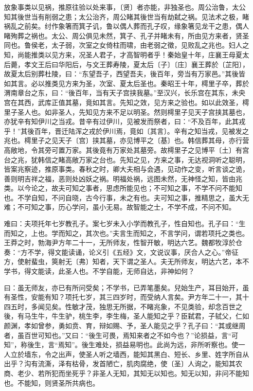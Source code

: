 \documentclass[]{article}
\begin{document}
放象事类以见祸，推原往验以处来事，〔贤〕者亦能，非独圣也。周公治鲁，太公知其後世当有削弱之患；太公治齐，周公睹其後世当有劫弑之祸。见法术之极，睹祸乱之前矣。纣作象箸而箕子讥，鲁以偶人葬而孔子叹，缘象箸见龙干之患，偶人睹殉葬之祸也。太公、周公俱见未然，箕子、孔子并睹未有，所由见方来者，贤圣同也。鲁侯老，太子弱，次室之女倚柱而啸，由老弱之徵，见败乱之兆也。妇人之知，尚能推类以见方来，况圣人君子，才高智明者乎！秦始皇十年，庄襄王母夏太后薨，孝文王后曰华阳后，与文王葬寿陵，夏太后〔子〕〔庄〕襄王葬於〔芷阳〕，故夏太后别葬杜陵，曰：``东望吾子，西望吾夫，後百年，旁当有万家邑。''其後皆如其言。必以推类见方来为圣，次室、夏太后圣也。秦昭王十年，樗里子卒，葬於渭南章台之东，曰：``後百年，当有天子宫挟我墓。''至汉兴，长乐宫在其东，未央宫在其西，武库正值其墓，竟如其言。先知之效，见方来之验也。如以此效圣，樗里子圣人也。如非圣人，先知见方来不足以明圣。然则樗里子见天子宫挟其墓也，亦犹辛有知伊川之当戎。昔辛有过伊川，见被发而祭者，曰：``不及百年，此其戎乎！''其後百年，晋迁陆浑之戎於伊川焉，竟如〔其言〕。辛有之知当戎，见被发之兆也。樗里子之见天子〔宫〕挟其墓，亦见博平之〔基〕也。韩信葬其母，亦行营高敞地，令其旁可置万家。其後竟有万家处其墓旁。故樗里子之见博平〔土〕有宫台之兆，犹韩信之睹高敞万家之台也。先知之见，方来之事，无达视洞听之聪明，皆案兆察迹，推原事类。春秋之时，卿大夫相与会遇，见动作之变，听言谈之诡，善则明吉祥之福，恶则处凶妖之祸。明福处祸，远图未然，无神怪之知，皆由兆类。以今论之，故夫可知之事者，思虑所能见也；不可知之事，不学不问不能知也。不学自知，不问自晓，古今行事，未之有也。夫可知之事，推精思之，虽大无难；不可知之事，历心学问，虽小无易。故智能之士，不学不成，不问不知。

难曰：夫项托年七岁教孔子。案七岁未入小学而教孔子，性自知也。孔子曰：``生而知之，上也。学而知之，其次也。''夫言生而知之，不言学问，谓若项托之类也。王莽之时，勃海尹方年二十一，无所师友，性智开敏，明达六艺。魏都牧淳於仓奏：``方不学，得文能读诵，论义引《五经》文，文说议事，厌合人之心。''帝征方，使射蜚虫，筴射无〔弗〕知者，天下谓之圣人。夫无所师友，明达六艺，本不学书，得文能读，此圣人也。不学自能，无师自达，非神如何？

曰：虽无师友，亦已有所问受矣；不学书，已弄笔墨矣。兒始生产，耳目始开，虽有圣性，安能有知？项托七岁，其三四岁时，而受纳人言矣。尹方年二十一，其十四五时，多闻见矣。性敏才茂，独思无所据，不睹兆象，不见类验，却念百世之後，有马生牛，牛生驴，桃生李，李生梅，圣人能知之乎？臣弑君，子轼父，仁如颜渊，孝如曾参，勇如贲、育，辩如赐、予，圣人能见之乎？孔子曰：``其或继周者，虽百世可知也。''又曰：``後生可畏，焉知来者之不如今也？''论损益，言``可知''，称後生，言``焉知''。後生难处，损益易明也。此尚为远，非所听察也。使一人立於墙东，令之出声，使圣人听之墙西，能知其黑白、短长、乡里、姓字所自从出乎？沟有流澌，泽有枯骨，发首陋亡，肌肉腐绝，使〔圣〕人询之，能知其农商、老少、若所犯而坐死乎？非圣人无知，其知无以知也。知无以知，非问不能知也。不能知，则贤圣所共病也。
\end{document}
